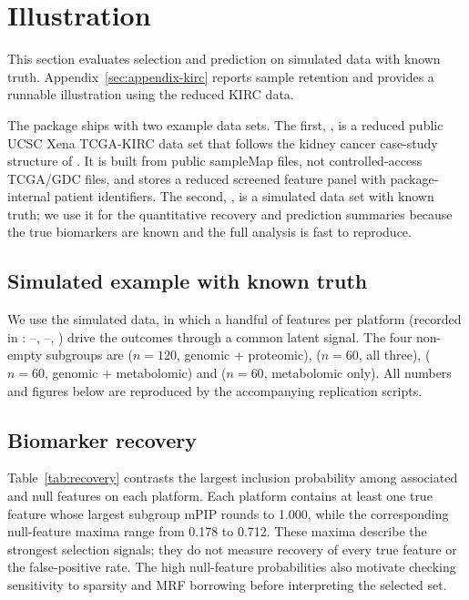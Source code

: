 \documentclass[article]{jss}
\begin{document}
\section{Illustration}\label{sec:illustration}

This section evaluates selection and prediction on simulated data with known
truth. Appendix~\ref{sec:appendix-kirc} reports sample retention and provides
a runnable illustration using the reduced KIRC data.

The package ships with two example data sets.  The first, , is a
reduced public UCSC Xena TCGA-KIRC data set that follows the kidney cancer
case-study structure of \citet{chekouo2017}.  It is built from public sampleMap
files, not controlled-access TCGA/GDC files, and stores a reduced screened
feature panel with package-internal patient identifiers.  The second,
, is a simulated data set with known truth; we use it for the
quantitative recovery and prediction summaries because the true biomarkers are
known and the full analysis is fast to reproduce.

\subsection{Simulated example with known truth}\label{sec:sim-illustration}

We use the simulated  data, in which a handful of features per
platform (recorded in : --,
--, ) drive the outcomes through a common latent
signal. The four non-empty subgroups are  ($n=120$, genomic +
proteomic),  ($n=60$, all three),  ($n=60$, genomic +
metabolomic) and  ($n=60$, metabolomic only). All numbers and figures
below are reproduced by the accompanying replication scripts.

\subsection{Biomarker recovery}\label{sec:recovery}

Table~\ref{tab:recovery} contrasts the largest inclusion probability among
associated and null features on each platform. Each platform contains at least one true feature whose largest subgroup mPIP
rounds to 1.000, while the corresponding null-feature maxima range from 0.178
to 0.712. These maxima describe the strongest selection signals; they do not
measure recovery of every true feature or the false-positive rate. The high
null-feature probabilities also motivate checking sensitivity to sparsity and
MRF borrowing before interpreting the selected set.
\end{document}
